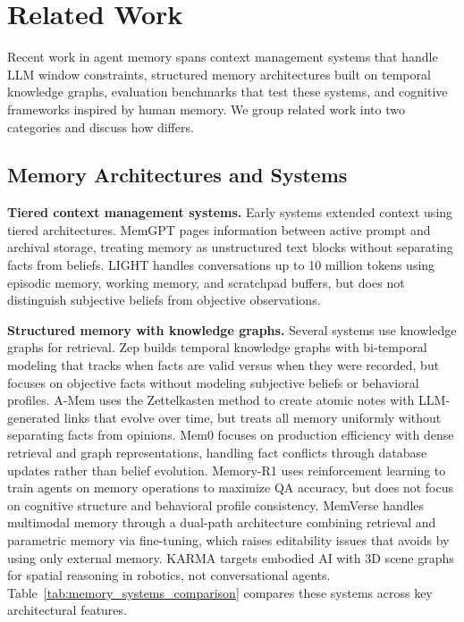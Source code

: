 \section{Related Work}
\label{sec:related-work}

Recent work in agent memory spans context management systems that handle LLM window constraints, structured memory architectures built on temporal knowledge graphs, evaluation benchmarks that test these systems, and cognitive frameworks inspired by human memory. We group related work into two categories and discuss how \our differs.

\subsection{Memory Architectures and Systems}

\textbf{Tiered context management systems.} Early systems extended context using tiered architectures. MemGPT \citep{packer2023memgpt} pages information between active prompt and archival storage, treating memory as unstructured text blocks without separating facts from beliefs. LIGHT \citep{tavakoli2025beyond} handles conversations up to 10 million tokens using episodic memory, working memory, and scratchpad buffers, but does not distinguish subjective beliefs from objective observations.

\textbf{Structured memory with knowledge graphs.} Several systems use knowledge graphs for retrieval. Zep \citep{rasmussen2025zep} builds temporal knowledge graphs with bi-temporal modeling that tracks when facts are valid versus when they were recorded, but focuses on objective facts without modeling subjective beliefs or behavioral profiles. A-Mem \citep{xu2025mem} uses the Zettelkasten method to create atomic notes with LLM-generated links that evolve over time, but treats all memory uniformly without separating facts from opinions. Mem0 \citep{chhikara2025mem0} focuses on production efficiency with dense retrieval and graph representations, handling fact conflicts through database updates rather than belief evolution. Memory-R1 \citep{yan2025memory} uses reinforcement learning to train agents on memory operations to maximize QA accuracy, but does not focus on cognitive structure and behavioral profile consistency. MemVerse \citep{liu2025memverse} handles multimodal memory through a dual-path architecture combining retrieval and parametric memory via fine-tuning, which raises editability issues that \our avoids by using only external memory. KARMA \citep{wang2025karma} targets embodied AI with 3D scene graphs for spatial reasoning in robotics, not conversational agents. Table~\ref{tab:memory_systems_comparison} compares these systems across key architectural features.

